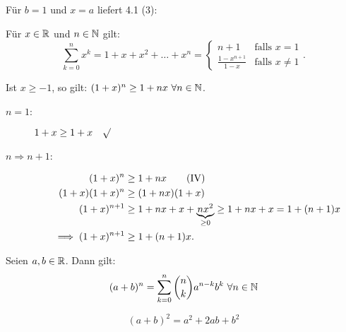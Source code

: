 \documentclass[a4paper,twoside,DIV15,BCOR12mm]{scrbook}
\begin{document}
\begin{satz}[Folgerung]
Für $b=1$ und $x=a$ liefert 4.1 (3):

Für $x\in\mathbb{R}$ und $n\in\mathbb{N}$ gilt:
$$\sum_{k=0}^{n}{x^k}=1+x+x^2+\ldots+x^n=\begin{cases}
 n+1&  \text{falls }x=1\\
 \frac{1-x^{n+1}}{1-x}&  \text{falls }x\ne1
 \end{cases}\text{.}$$
\end{satz}

\begin{satz}

Ist $x\ge-1$, so gilt: $(1+x)^n\ge1+nx\ \forall n\in\mathbb{N}$.
\end{satz}

\begin{beweis}
\begin{description}
\item[$n=1$:] $1+x\ge1+x\quad\surd$
\item[$n\Rightarrow n+1$:]
\begin{align*}
(1+x)^n&\ge1+nx\qquad\text{(IV)}\\
(1+x)(1+x)^n&\ge(1+nx)(1+x)\\
(1+x)^{n+1}&\ge1+nx+x+\underbrace{nx^2}_{\ge0}\ge1+nx+x=1+(n+1)x\\
\implies(1+x)^{n+1}&\ge1+(n+1)x\text{.}
\end{align*}
\end{description}
\end{beweis}

\begin{satz}
Seien $a,b\in\mathbb{R}$. Dann gilt:
\begin{displaymath}
(a+b)^n=\sum_{k=0}^n{\binom{n}{k}a^{n-k}b^k}\ \forall n\in\MdN
\end{displaymath}
\end{satz}

\begin{beispiel}
$$(a+b)^2=a^2+2ab+b^2$$
\end{beispiel}
\end{document}
